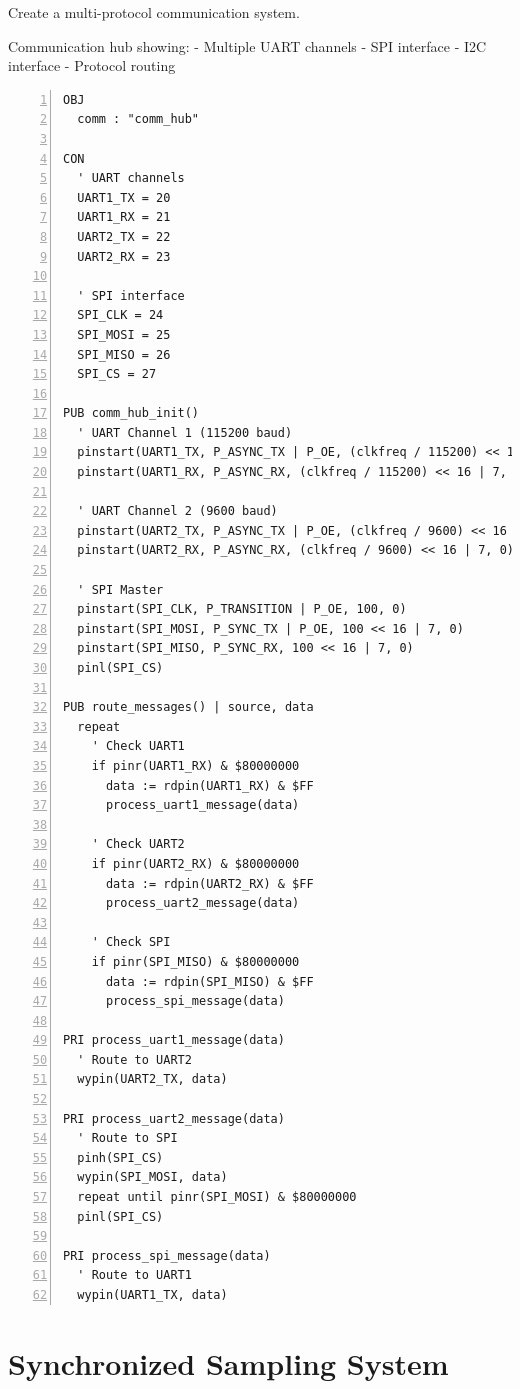 \documentclass[11pt,a4paper,oneside,english]{book}
\begin{document}
Create a multi-protocol communication system.

Communication hub showing: - Multiple UART channels - SPI interface -
I2C interface - Protocol routing

\begin{Spin2Block}
\begin{Verbatim}[numbers=left,numbersep=5pt,xleftmargin=15pt]
OBJ
  comm : "comm_hub"
  
CON
  ' UART channels
  UART1_TX = 20
  UART1_RX = 21
  UART2_TX = 22
  UART2_RX = 23
  
  ' SPI interface
  SPI_CLK = 24
  SPI_MOSI = 25
  SPI_MISO = 26
  SPI_CS = 27
  
PUB comm_hub_init()
  ' UART Channel 1 (115200 baud)
  pinstart(UART1_TX, P_ASYNC_TX | P_OE, (clkfreq / 115200) << 16 | 7, 0)
  pinstart(UART1_RX, P_ASYNC_RX, (clkfreq / 115200) << 16 | 7, 0)
  
  ' UART Channel 2 (9600 baud)
  pinstart(UART2_TX, P_ASYNC_TX | P_OE, (clkfreq / 9600) << 16 | 7, 0)
  pinstart(UART2_RX, P_ASYNC_RX, (clkfreq / 9600) << 16 | 7, 0)
  
  ' SPI Master
  pinstart(SPI_CLK, P_TRANSITION | P_OE, 100, 0)
  pinstart(SPI_MOSI, P_SYNC_TX | P_OE, 100 << 16 | 7, 0)
  pinstart(SPI_MISO, P_SYNC_RX, 100 << 16 | 7, 0)
  pinl(SPI_CS)

PUB route_messages() | source, data
  repeat
    ' Check UART1
    if pinr(UART1_RX) & $80000000
      data := rdpin(UART1_RX) & $FF
      process_uart1_message(data)
    
    ' Check UART2  
    if pinr(UART2_RX) & $80000000
      data := rdpin(UART2_RX) & $FF
      process_uart2_message(data)
      
    ' Check SPI
    if pinr(SPI_MISO) & $80000000
      data := rdpin(SPI_MISO) & $FF
      process_spi_message(data)

PRI process_uart1_message(data)
  ' Route to UART2
  wypin(UART2_TX, data)
  
PRI process_uart2_message(data)
  ' Route to SPI
  pinh(SPI_CS)
  wypin(SPI_MOSI, data)
  repeat until pinr(SPI_MOSI) & $80000000
  pinl(SPI_CS)
  
PRI process_spi_message(data)
  ' Route to UART1
  wypin(UART1_TX, data)
\end{Verbatim}
\end{Spin2Block}

\hypertarget{synchronized-sampling-system}{%
\section{Synchronized Sampling
System}\label{synchronized-sampling-system}}
\end{document}
